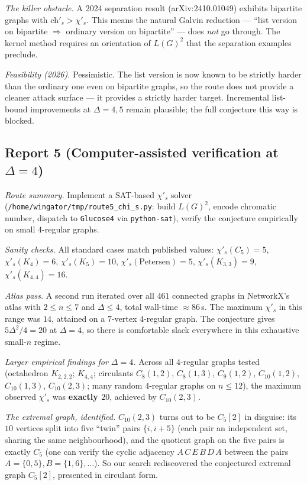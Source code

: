 \documentclass[11pt]{article}
\newcommand{\sci}{\chi'_s}
\begin{document}
\emph{The killer obstacle.} A 2024 separation result
(arXiv:2410.01049) exhibits bipartite graphs with $\mathrm{ch}'_s > \sci$.
This means the natural Galvin reduction --- ``list version on
bipartite $\Rightarrow$ ordinary version on bipartite'' --- does
\emph{not} go through. The kernel method requires an orientation of
$L(G)^2$ that the separation examples preclude.

\emph{Feasibility (2026).} Pessimistic. The list version is now
known to be strictly harder than the ordinary one even on
bipartite graphs, so the route does not provide a cleaner attack
surface --- it provides a strictly harder target. Incremental
list-bound improvements at $\Delta=4, 5$ remain plausible; the full
conjecture this way is blocked.

\subsection*{Report 5 (Computer-assisted verification at $\Delta = 4$)}

\emph{Route summary.} Implement a SAT-based $\sci$ solver
(\verb|/home/wingator/tmp/route5_chi_s.py|: build $L(G)^2$, encode
chromatic number, dispatch to \texttt{Glucose4} via \texttt{python-sat}),
verify the conjecture empirically on small $4$-regular graphs.

\emph{Sanity checks.} All standard cases match published values:
$\sci(C_5) = 5$, $\sci(K_4) = 6$, $\sci(K_5) = 10$,
$\sci(\mathrm{Petersen}) = 5$, $\sci(K_{3,3}) = 9$,
$\sci(K_{4,4}) = 16$.

\emph{Atlas pass.} A second run iterated over all $461$ connected
graphs in NetworkX's atlas with $2 \leq n \leq 7$ and $\Delta \leq 4$,
total wall-time $\approx 86$\,s. The maximum $\sci$ in this range
was $14$, attained on a $7$-vertex $4$-regular graph. The conjecture
gives $5\Delta^2/4 = 20$ at $\Delta = 4$, so there is comfortable
slack everywhere in this exhaustive small-$n$ regime.

\emph{Larger empirical findings for $\Delta = 4$.} Across all
$4$-regular graphs tested (octahedron $K_{2,2,2}$; $K_{4,4}$;
circulants $C_8(1,2)$, $C_8(1,3)$, $C_9(1,2)$, $C_{10}(1,2)$,
$C_{10}(1,3)$, $C_{10}(2,3)$; many random $4$-regular graphs on
$n \leq 12$), the maximum observed $\sci$ was \textbf{exactly $20$},
achieved by $C_{10}(2,3)$.

\emph{The extremal graph, identified.} $C_{10}(2,3)$ turns out to
be $C_5[2]$ in disguise: its $10$ vertices split into five ``twin''
pairs $\{i, i+5\}$ (each pair an independent set, sharing the same
neighbourhood), and the quotient graph on the five pairs is exactly
$C_5$ (one can verify the cyclic adjacency $A\,C\,E\,B\,D\,A$ between
the pairs $A = \{0,5\}, B = \{1,6\}, \dots$). So our search rediscovered
the conjectured extremal graph $C_5[2]$, presented in circulant
form.
\end{document}
